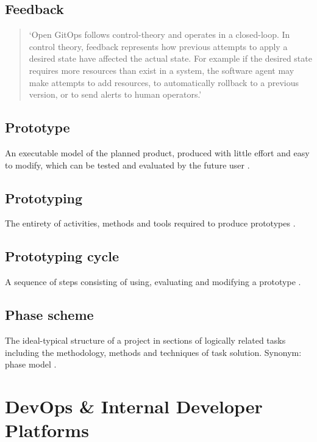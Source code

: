 \subsection*{Feedback}
\begin{quotation}
\noindent
\enquote*{Open GitOps follows control-theory and operates in a closed-loop. In control theory, feedback represents how previous attempts to apply a desired state have affected the actual state. For example if the desired state requires more resources than exist in a system, the software agent may make attempts to add resources, to automatically rollback to a previous version, or to send alerts to human operators.}
\autocite{gitopsGlossary}
\end{quotation}


\subsection*{Prototype}
An executable model of the planned product, produced with little effort and easy to modify,
which can be tested and evaluated by the future user
\autocite{riedlManagementInformatik2019}.

\subsection*{Prototyping}
The entirety of activities, methods and tools required to produce prototypes
\autocite{riedlManagementInformatik2019}.

\subsection*{Prototyping cycle}
A sequence of steps consisting of using, evaluating and modifying a prototype
\autocite{riedlManagementInformatik2019}.

\subsection*{Phase scheme}
The ideal-typical structure of a project in sections of logically related tasks including the methodology,
methods and techniques of task solution. Synonym: phase model
\autocite{riedlManagementInformatik2019}.










\section{DevOps \& Internal Developer Platforms}

